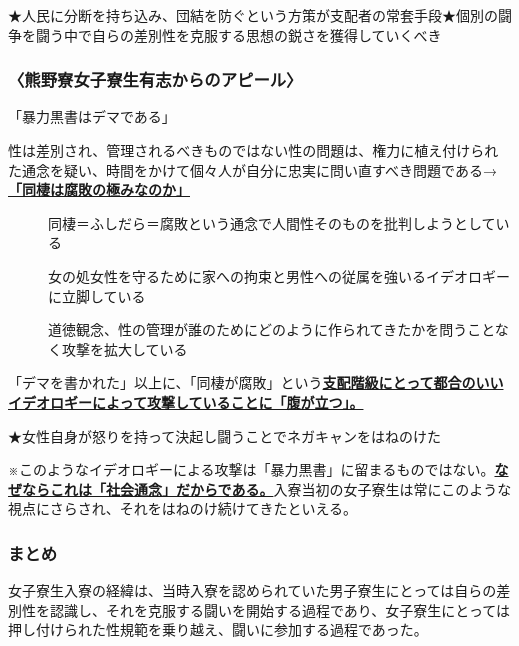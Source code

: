 \vspace{1mm}
\noindent ★人民に分断を持ち込み、団結を防ぐという方策が支配者の常套手段\newline ★個別の闘争を闘う中で自らの差別性を克服する思想の鋭さを獲得していくべき

\subsubsection{\large 〈熊野寮女子寮生有志からのアピール〉}
「暴力黒書はデマである」

\vspace{1mm}
\noindent 性は差別され、管理されるべきものではない\newline 性の問題は、権力に植え付けられた通念を疑い、時間をかけて個々人が自分に忠実に問い直すべき問題である\newline →\uline{\bf{「同棲は腐敗の極みなのか」}}
\begin{description}
\item[  ]同棲＝ふしだら＝腐敗という通念で人間性そのものを批判しようとしている
\item[  ]女の処女性を守るために家への拘束と男性への従属を強いるイデオロギーに立脚している
\item[  ]道徳観念、性の管理が誰のためにどのように作られてきたかを問うことなく攻撃を拡大している
\end{description}

\vspace{1mm}
\noindent 「デマを書かれた」以上に、「同棲が腐敗」という\uline{\bf{支配階級にとって都合のいいイデオロギーによって攻撃していることに「腹が立つ」。}}

\vspace{1mm}
\noindent ★女性自身が怒りを持って決起し闘うことでネガキャンをはねのけた

\vspace{1mm}
\noindent ※このようなイデオロギーによる攻撃は「暴力黒書」に留まるものではない。\uline{\bf{なぜならこれは「社会通念」だからである。}}入寮当初の女子寮生は常にこのような視点にさらされ、それをはねのけ続けてきたといえる。

\subsubsection{\large まとめ}
女子寮生入寮の経緯は、当時入寮を認められていた男子寮生にとっては自らの差別性を認識し、それを克服する闘いを開始する過程であり、女子寮生にとっては押し付けられた性規範を乗り越え、闘いに参加する過程であった。

